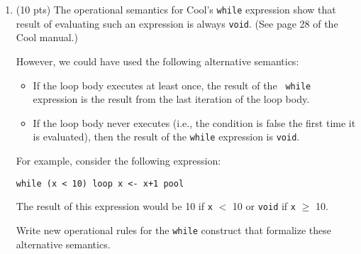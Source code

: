 \documentclass[10pt]{article}
\newcommand{\ttmath}[1]{$\mathtt{#1}$}
\newcommand{\ossimple}[6]{#1,#2,#3\vdash #4 : #5,#6}
\newcommand{\deduct}[3]{\frac{#1}{#2}\eqno\mbox{#3}}
\begin{document}
\begin{enumerate}
\texttt{a[\ttmath{e_1}] \ttmath{\leftarrow e_2}} \\
$$
\deduct{
	\begin{array}{l}
		\ossimple{so}{S_1}{E}{e_2}{v}{S_2}	\\
		E(a[e_1]) = l_a 					\\
		S = S_1[v/l_a]						\\
	\end{array}
}{
	\ossimple{so}{S_1}{E}{\texttt{a[\ttmath{e_1}] \ttmath{\leftarrow e_2}} } {v}{S} \\
}{
	[Assign-Array]
}
$$
\texttt{a[e]} \\
$$\deduct{
	\begin{array}{l}
		E(a[e]) = l_a 	\\
		S(l_a) = v 		\\
	\end{array}	
}{
	\ossimple{so}{S_1}{E}{\texttt{a[e]}}{v}{S} \\	
}{
	[Reference-Array]
}$$

\pagebreak

\item (10 pts)
The operational semantics for Cool's {\tt while} expression show that
result of evaluating such an expression is always {\tt void}.  (See page
28 of the Cool manual.)

However, we could have used the following alternative semantics:

\begin{itemize}

\item If the loop body executes at least once, the result of the {\tt
while} expression is the result from the last iteration of the loop body.

\item If the loop body never executes (i.e., the condition is false the
first time it is evaluated), then the result of the {\tt while} expression
is {\tt void}.

\end{itemize}

For example, consider the following expression:

\begin{center}
{\tt while (x < 10) loop x <- x+1 pool}
\end{center}

The result of this expression would be 10 if {\tt x} $<$ 10 or {\tt void}
if {\tt x} $\geq$ 10.

Write new operational rules for the {\tt while} construct that formalize
these alternative semantics.



\end{enumerate}
\end{document}
